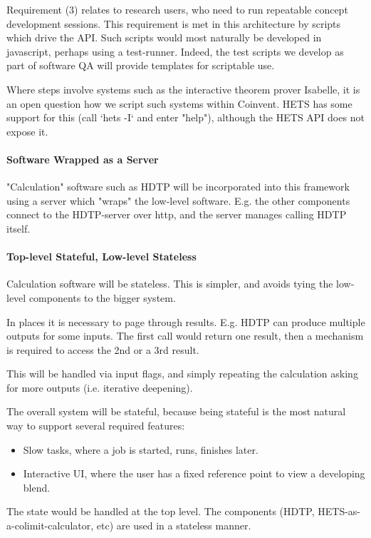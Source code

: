 Requirement (3) relates to research users, who need to run repeatable concept development sessions. This requirement is met in this architecture by scripts which drive the API. Such scripts would most naturally be developed in javascript, perhaps using a test-runner. Indeed, the test scripts we develop as part of software QA will provide templates for scriptable use.

Where steps involve systems such as the interactive theorem prover Isabelle, it is an open question how we script such systems within Coinvent. HETS
has some support for this (call `hets -I` and enter "help"), 
although the HETS API does not expose it.

\paragraph{Software Wrapped as a Server}

"Calculation" software such as HDTP will be incorporated into this framework using a server which "wraps" the low-level software. E.g. the other components connect to the HDTP-server over http, and the server manages calling HDTP itself.


\paragraph{Top-level Stateful, Low-level Stateless}

Calculation software will be stateless. This is simpler, and avoids tying the
low-level components to the bigger system.

In places it is necessary to page through results.
E.g. HDTP can produce multiple outputs for some inputs.
The first call would return one result, then a mechanism is required to access the 2nd or a 3rd result.

This will be handled via input flags, and simply repeating
the calculation asking for more outputs (i.e. iterative deepening).

The overall system will be stateful, because being stateful is the
most natural way to support several required features:
\begin{itemize}
\item Slow tasks, where a job is started, runs, finishes later.
\item Interactive UI, where the user has a fixed reference point to view
a developing blend.
\end{itemize}
The state would be handled at the top level. The components
(HDTP, HETS-as-a-colimit-calculator, etc) are used in a stateless manner.


